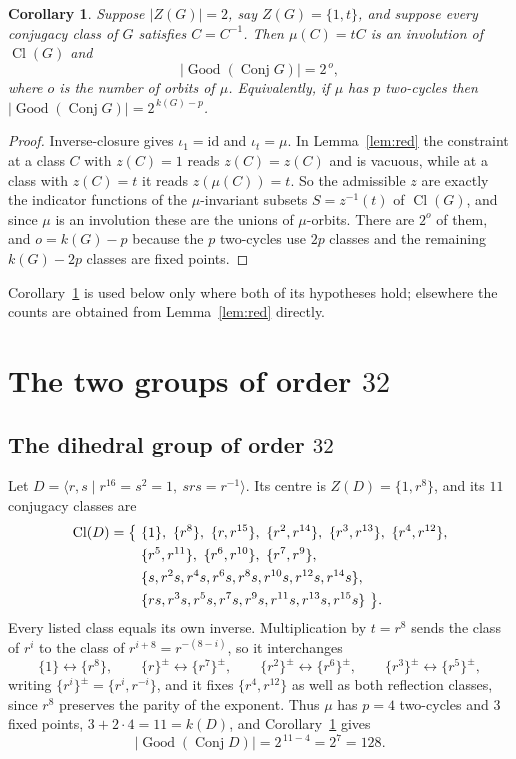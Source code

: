 \documentclass[11pt]{amsart}
\newtheorem{corollary}[theorem]{Corollary}
\theoremstyle{definition}
\newcommand{\Conj}{\operatorname{Conj}}
\newcommand{\Good}{\operatorname{Good}}
\newcommand{\Cl}{\operatorname{Cl}}
\newcommand{\Zc}{Z}
\begin{document}
\begin{corollary}\label{cor:formula}
Suppose $\lvert \Zc(G)\rvert=2$, say $\Zc(G)=\{1,t\}$, and suppose every conjugacy class of
$G$ satisfies $C=C^{-1}$. Then $\mu(C)=tC$ is an involution of $\Cl(G)$ and
\[
 \lvert\Good(\Conj G)\rvert=2^{\,o},
\]
where $o$ is the number of orbits of $\mu$. Equivalently, if $\mu$ has $p$ two-cycles then
$\lvert\Good(\Conj G)\rvert=2^{\,k(G)-p}$.
\end{corollary}

\begin{proof}
Inverse-closure gives $\iota_1=\mathrm{id}$ and $\iota_t=\mu$. In Lemma~\ref{lem:red} the
constraint at a class $C$ with $z(C)=1$ reads $z(C)=z(C)$ and is vacuous, while at a class
with $z(C)=t$ it reads $z(\mu(C))=t$. So the admissible $z$ are exactly the indicator
functions of the $\mu$-invariant subsets $S=z^{-1}(t)$ of $\Cl(G)$, and since $\mu$ is an
involution these are the unions of $\mu$-orbits. There are $2^o$ of them, and
$o=k(G)-p$ because the $p$ two-cycles use $2p$ classes and the remaining $k(G)-2p$ classes
are fixed points.
\end{proof}

\noindent
Corollary~\ref{cor:formula} is used below only where both of its hypotheses hold; elsewhere
the counts are obtained from Lemma~\ref{lem:red} directly.

\section{The two groups of order \texorpdfstring{$32$}{32}}

\subsection*{The dihedral group of order \texorpdfstring{$32$}{32}}
Let $D=\langle r,s\mid r^{16}=s^2=1,\ srs=r^{-1}\rangle$. Its centre is
$\Zc(D)=\{1,r^{8}\}$, and its $11$ conjugacy classes are
\begin{align}
\Cl(D)=\bigl\{\ &\{1\},\ \{r^{8}\},\ \{r,r^{15}\},\ \{r^{2},r^{14}\},\ \{r^{3},r^{13}\},\
                 \{r^{4},r^{12}\},\notag\\
              &\{r^{5},r^{11}\},\ \{r^{6},r^{10}\},\ \{r^{7},r^{9}\},\notag\\
              &\{s,r^{2}s,r^{4}s,r^{6}s,r^{8}s,r^{10}s,r^{12}s,r^{14}s\},\notag\\
              &\{rs,r^{3}s,r^{5}s,r^{7}s,r^{9}s,r^{11}s,r^{13}s,r^{15}s\}\ \bigr\}.
\label{eq:clD}
\end{align}
Every listed class equals its own inverse. Multiplication by $t=r^{8}$ sends the class of
$r^{i}$ to the class of $r^{i+8}=r^{-(8-i)}$, so it interchanges
\[
 \{1\}\leftrightarrow\{r^{8}\},\qquad
 \{r\}^{\pm}\leftrightarrow\{r^{7}\}^{\pm},\qquad
 \{r^{2}\}^{\pm}\leftrightarrow\{r^{6}\}^{\pm},\qquad
 \{r^{3}\}^{\pm}\leftrightarrow\{r^{5}\}^{\pm},
\]
writing $\{r^{i}\}^{\pm}=\{r^{i},r^{-i}\}$, and it fixes $\{r^{4},r^{12}\}$ as well as both
reflection classes, since $r^{8}$ preserves the parity of the exponent. Thus $\mu$ has
$p=4$ two-cycles and $3$ fixed points, $3+2\cdot4=11=k(D)$, and
Corollary~\ref{cor:formula} gives
\[
 \lvert\Good(\Conj D)\rvert=2^{\,11-4}=2^{7}=128 .
\]
\end{document}
